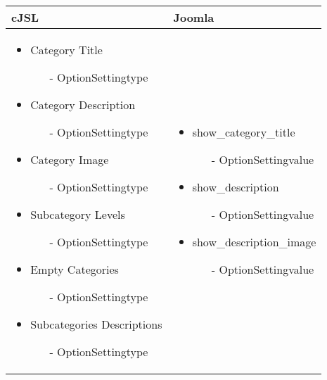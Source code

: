 \begin{minipage}{0.7\textwidth}
\begin{tabular}{|p{} | p{}|}
\hline
\textbf{cJSL} & \textbf{Joomla} \\ 
\hline
\begin{itemize}
	\item Category Title 
		\begin{enumerate}
			\item[-] OptionSettingtype
		\end{enumerate} 
	\item Category Description
	\begin{enumerate}
		\item[-] OptionSettingtype
	\end{enumerate}
	\item Category Image
	\begin{enumerate}
		\item[-] OptionSettingtype
	\end{enumerate} 
	\item Subcategory Levels
	\begin{enumerate}
		\item[-] OptionSettingtype
	\end{enumerate} 
	\item Empty Categories
	\begin{enumerate}
			\item[-] OptionSettingtype
	\end{enumerate}
	\item Subcategories Descriptions
	\begin{enumerate}
		\item[-] OptionSettingtype
	\end{enumerate}
\end{itemize}
 & 
\begin{itemize}
	\item show\_category\_title 
		\begin{enumerate}
			\item[-] OptionSettingvalue
		\end{enumerate} 
	\item show\_description
	\begin{enumerate}
		\item[-] OptionSettingvalue
	\end{enumerate}
	\item show\_description\_image
	\begin{enumerate}
		\item[-] OptionSettingvalue

\end{enumerate}
\end{itemize}
\end{tabular}
\end{minipage}
